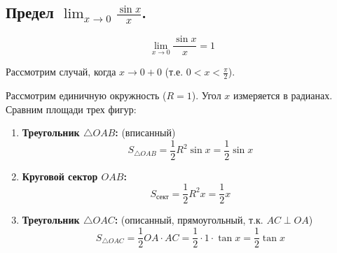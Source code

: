 \subsection{Предел $\lim_{x\to 0} \frac{\sin x}{x}$.}

\[ \lim_{x \to 0} \frac{\sin x}{x} = 1 \]

\begin{tcolorbox}[title=Доказательство, breakable]
    Рассмотрим случай, когда $x \to 0+0$ (т.е. $0 < x < \frac{\pi}{2}$).
    
    \begin{center}
\end{center}

    Рассмотрим единичную окружность ($R=1$). Угол $x$ измеряется в радианах.
    Сравним площади трех фигур:
    \begin{enumerate}
        \item \textbf{Треугольник $\triangle OAB$:} (вписанный)
        \[ S_{\triangle OAB} = \frac{1}{2} R^2 \sin x = \frac{1}{2} \sin x \]
        \item \textbf{Круговой сектор $OAB$:}
        \[ S_{\text{сект}} = \frac{1}{2} R^2 x = \frac{1}{2} x \]
        \item \textbf{Треугольник $\triangle OAC$:} (описанный, прямоугольный, т.к. $AC \perp OA$)
        \[ S_{\triangle OAC} = \frac{1}{2} OA \cdot AC = \frac{1}{2} \cdot 1 \cdot \tan x = \frac{1}{2} \tan x \]
    \end{enumerate}


\end{tcolorbox}
